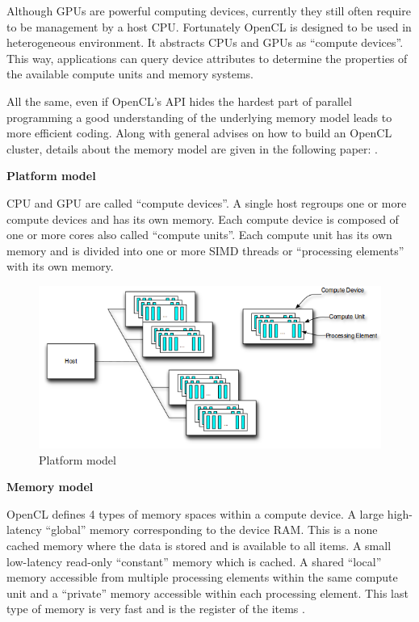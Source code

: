 Although GPUs are powerful computing devices, currently they still often
require to be management by a host CPU. Fortunately OpenCL is designed to be used in
heterogeneous environment. It abstracts CPUs and GPUs as “compute devices”.
This way, applications can query device attributes to determine the
properties of the available compute units and memory systems.
\citep{Reference5}

All the same, even if OpenCL's API hides the hardest part of parallel
programming a good understanding of the underlying memory model leads to more
efficient coding. Along with general advises on how to build an OpenCL
cluster, details about the memory model are given in the following paper:
\citep{Reference4}.

\textbf{Platform model}

CPU and GPU are called “compute devices”. A single host regroups one or more
compute devices and has its own memory. Each compute device is composed of one
or more cores also called “compute units”. Each compute unit has its own memory
and is divided into one or more SIMD threads or “processing elements” with its
own memory. \citep{Reference4}

\begin{figure}[H] \centering
\includegraphics[width=\textwidth]{./Figures/plateform_model.png}
\caption[Platform model]{Platform model \citep{Reference4}}
\label{fig:plateform_model} \end{figure}


\textbf{Memory model}

OpenCL defines 4 types of memory spaces within a compute device. A large
high-latency “global” memory corresponding to the device RAM. This is a none
cached memory  where the data is stored and is available to all items. A small
low-latency read-only “constant” memory which is cached. A shared “local”
memory accessible from multiple processing elements within the same compute
unit and a “private” memory accessible within each processing element. This
last type of memory is very fast and is the register of the items
\citep{Reference4}.

